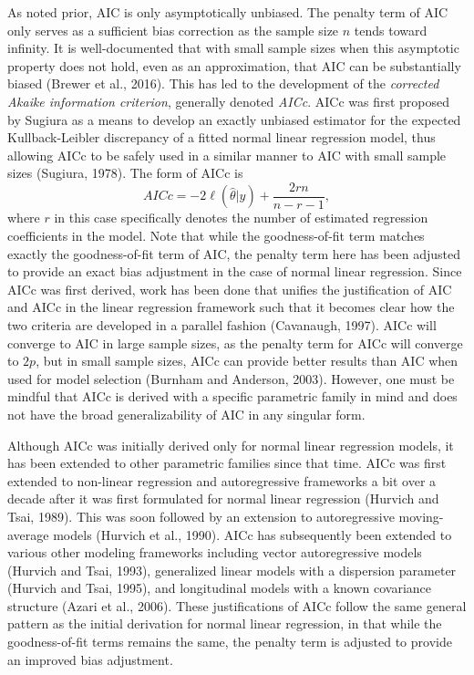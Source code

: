 		As noted prior, AIC is only asymptotically unbiased. The penalty term of AIC only serves as a sufficient bias correction as the sample size $n$ tends toward infinity. It is well-documented that
		with small sample sizes when this asymptotic property does not hold, even as an approximation, that AIC can be substantially biased (Brewer et al., 2016). This has led to the development of the 
		\textit{corrected Akaike information criterion}, generally denoted \textit{AICc}. AICc was first proposed by Sugiura as a means to develop an exactly unbiased estimator for the expected
		Kullback-Leibler discrepancy of a fitted normal linear regression model, thus allowing AICc to be safely used in a similar manner to AIC with small sample sizes (Sugiura, 1978). The form of AICc is 
		\begin{equation*}
			AICc = -2 \ell(\hat{\theta}|y) + \frac{2 r n}{n - r - 1},
		\end{equation*}
		where $r$ in this case specifically denotes the number of estimated regression coefficients in the model. Note that while the goodness-of-fit term matches exactly the goodness-of-fit term
		of AIC, the penalty term here has been adjusted to provide an exact bias adjustment in the case of  normal linear regression. Since AICc was first derived, work has been done that unifies
		the justification of AIC and AICc in the linear regression framework such that it becomes clear how the two criteria are developed in a parallel fashion (Cavanaugh, 1997). AICc will converge
		to AIC in large sample sizes, as the penalty term for AICc will converge to $2p$, but in small sample sizes, AICc can provide better results than AIC when used for model selection
		(Burnham and Anderson, 2003). However, one must be mindful that AICc is derived with a specific parametric family in mind and does not have the broad generalizability of AIC in any singular form.

		Although AICc was initially derived only for normal linear regression models, it has been extended to other parametric families since that time. AICc was first extended to non-linear regression
		and autoregressive frameworks a bit over a decade after it was first formulated for normal linear regression (Hurvich and Tsai, 1989). This was soon followed by an extension to autoregressive
		moving-average models (Hurvich et al., 1990). AICc has subsequently been extended to various other modeling frameworks including vector autoregressive models (Hurvich and Tsai, 1993), generalized
		linear models with a dispersion parameter (Hurvich and Tsai, 1995), and longitudinal models with a known covariance structure (Azari et al., 2006). These justifications of AICc follow the same general
		pattern as the initial derivation for normal linear regression, in that while the goodness-of-fit terms remains the same, the penalty term is adjusted to provide an improved bias adjustment.

